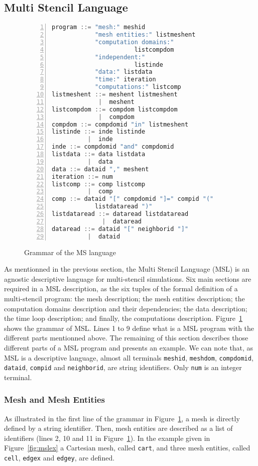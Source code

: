 \subsection{Multi Stencil Language}

\begin{figure}[t]
\begin{lstlisting}[basicstyle=\small,mathescape,frame=single,language=C++,numbers=left]
program ::= "mesh:" meshid 
            "mesh entities:" listmeshent
            "computation domains:" 
                       listcompdom
            "independent:"
                       listinde
            "data:" listdata
            "time:" iteration
            "computations:" listcomp
listmeshent ::= meshent listmeshent
             |  meshent
listcompdom ::= compdom listcompdom
             |  compdom
compdom ::= compdomid "in" listmeshent
listinde ::= inde listinde
          |  inde
inde ::= compdomid "and" compdomid
listdata ::= data listdata
          |  data
data ::= dataid "," meshent
iteration ::= num
listcomp ::= comp listcomp
          |  comp
comp ::= dataid "[" compdomid "]=" compid "(" 
            listdataread ")"
listdataread ::= dataread listdataread
              |  dataread
dataread ::= dataid "[" neighborid "]"
          |  dataid
\end{lstlisting}
\caption{Grammar of the MS language}
\label{fig:grammar}
\end{figure}

As mentionned in the previous section, the Multi Stencil Language (MSL) is an agnostic descriptive language for multi-stencil simulations. Six main sections are required in a MSL description, as the six tuples of the formal definition of a multi-stencil program: the mesh description; the mesh entities description; the computation domains description and their dependencies; the data description; the time loop description; and finally, the computations description. Figure~\ref{fig:grammar} shows the grammar of MSL. Lines 1 to 9 define what is a MSL program with the different parts mentionned above. The remaining of this section describes those different parts of a MSL program and presents an example.
We can note that, as MSL is a descriptive language, almost all terminals \texttt{meshid}, \texttt{meshdom}, \texttt{compdomid}, \texttt{dataid}, \texttt{compid} and \texttt{neighborid}, are string identifiers. Only \texttt{num} is an integer terminal.

\subsubsection*{Mesh and Mesh Entities}
As illustrated in the first line of the grammar in Figure~\ref{fig:grammar}, a mesh is directly defined by a string identifier. Then, mesh entities are described as a list of identifiers (lines 2, 10 and 11 in Figure~\ref{fig:grammar}). In the example given in Figure~\ref{fig:mslex} a Cartesian mesh, called \texttt{cart}, and three mesh entities, called \texttt{cell}, \texttt{edgex} and \texttt{edgey}, are defined.

